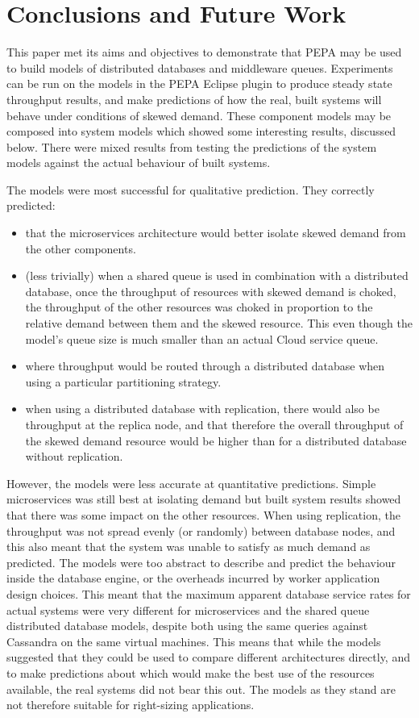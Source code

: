 %
%

\section{Conclusions and Future Work}\label{sec:conclusions}

This paper met its aims and objectives to demonstrate that PEPA may be used to build models of distributed databases and middleware queues.  Experiments can be run on the models in the PEPA Eclipse plugin to produce steady state throughput results, and make predictions of how the real, built systems will behave under conditions of skewed demand.  These component models may be composed into system models which showed some interesting results, discussed below.  There were mixed results from testing the predictions of the system models against the actual behaviour of built systems.
	
The models were most successful for qualitative prediction.  They correctly predicted:
\begin{itemize}
	\item that the microservices architecture would better isolate skewed demand from the other components.
	\item (less trivially) when a shared queue is used in combination with a distributed database, once the throughput of resources with skewed demand is choked, the throughput of the other resources was choked in proportion to the relative demand between them and the skewed resource.  This even though the model's queue size is much smaller than an actual Cloud service queue.
	\item where throughput would be routed through a distributed database when using a particular partitioning strategy.
	\item when using a distributed database with replication, there would also be throughput at the replica node, and that therefore the overall throughput of the skewed demand resource would be higher than for a distributed database without replication.
\end{itemize}

However, the models were less accurate at quantitative predictions.  Simple microservices was still best at isolating demand but built system results showed that there was some impact on the other resources.  When using replication, the throughput was not spread evenly (or randomly) between database nodes, and this also meant that the system was unable to satisfy as much demand as predicted.  The models were too abstract to describe and predict the behaviour inside the database engine, or the overheads incurred by worker application design choices.  This meant that the maximum apparent database service rates for actual systems were very different for microservices and the shared queue distributed database models, despite both using the same queries against Cassandra on the same virtual machines.  This means that while the models suggested that they could be used to compare different architectures directly, and to make predictions about which would make the best use of the resources available, the real systems did not bear this out.  The models as they stand are not therefore suitable for right-sizing applications.

